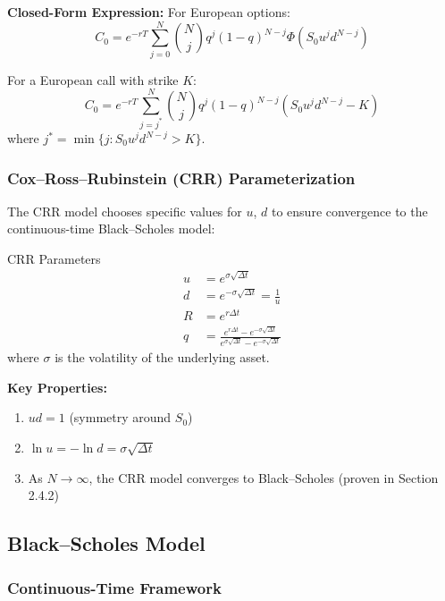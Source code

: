 \documentclass[10pt,twocolumn]{article}
\begin{document}
\begin{resultbox}
\textbf{Closed-Form Expression:} For European options:
\begin{equation}
C_0 = e^{-rT} \sum_{j=0}^{N} \binom{N}{j} q^j (1-q)^{N-j} \Phi(S_0 u^j d^{N-j})
\end{equation}

For a European call with strike $K$:
\begin{equation}
C_0 = e^{-rT} \sum_{j=j^*}^{N} \binom{N}{j} q^j (1-q)^{N-j} (S_0 u^j d^{N-j} - K)
\end{equation}
where $j^* = \min\{j : S_0 u^j d^{N-j} > K\}$.
\end{resultbox}

\subsubsection{Cox--Ross--Rubinstein (CRR) Parameterization}

The CRR model chooses specific values for $u$, $d$ to ensure convergence to the continuous-time Black--Scholes model:

\begin{keybox}{CRR Parameters}
\begin{align}
u &= e^{\sigma\sqrt{\Delta t}}\\
d &= e^{-\sigma\sqrt{\Delta t}} = \frac{1}{u}\\
R &= e^{r\Delta t}\\
q &= \frac{e^{r\Delta t} - e^{-\sigma\sqrt{\Delta t}}}{e^{\sigma\sqrt{\Delta t}} - e^{-\sigma\sqrt{\Delta t}}}
\end{align}
where $\sigma$ is the volatility of the underlying asset.
\end{keybox}

\textbf{Key Properties:}
\begin{enumerate}[itemsep=2pt]
    \item $ud = 1$ (symmetry around $S_0$)
    \item $\ln u = -\ln d = \sigma\sqrt{\Delta t}$
    \item As $N \to \infty$, the CRR model converges to Black--Scholes (proven in Section 2.4.2)
\end{enumerate}

\subsection{Black--Scholes Model}

\subsubsection{Continuous-Time Framework}
\end{document}
